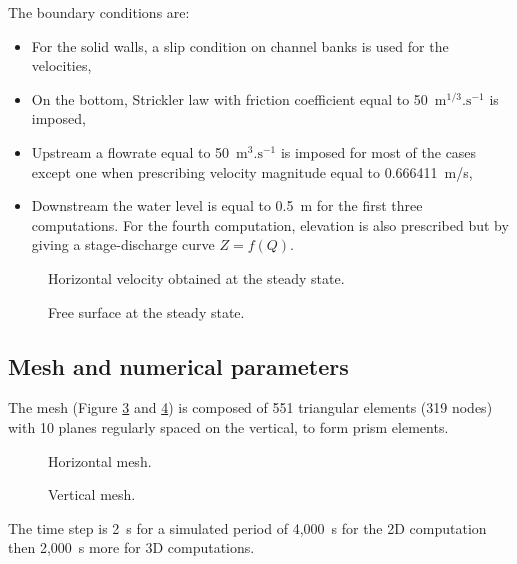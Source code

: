\bigskip
The boundary conditions are:
\begin{itemize}
\item For the solid walls, a slip condition on channel banks is used for the velocities,
\item On the bottom, Strickler law with friction coefficient equal to
50~$\text{m}^{1/3}.\text{s}^{-1}$ is imposed,
\item Upstream a flowrate equal to 50~$\text{m}^{3}.\text{s}^{-1}$ is imposed
for most of the cases except one when prescribing velocity magnitude equal to
0.666411~m/s,
\item Downstream the water level is equal to 0.5~m for the first three
computations.
For the fourth computation, elevation is also prescribed but by giving a
stage-discharge curve $Z = f(Q)$.
\end{itemize}
\begin{figure}[!htbp]
 \centering
 \caption{Horizontal velocity obtained at the steady state.}
 \label{t3d:canal:fig:veloH}
\end{figure}

\begin{figure}[!htbp]
 \centering
 \caption{Free surface at the steady state.}
 \label{t3d:canal:fig:freeSurface}
\end{figure}

\subsection{Mesh and numerical parameters}
\bigskip
The mesh (Figure \ref{t3d:canal:fig:meshH} and \ref{t3d:canal:fig:meshV})  
is composed of 551 triangular elements (319 nodes) with 10 planes  
regularly spaced on the vertical, to form prism elements.\\

\begin{figure}[!htbp]
 \centering
 \caption{Horizontal mesh.}
 \label{t3d:canal:fig:meshH}
\end{figure}
\begin{figure}[!htbp]
 \centering
 \caption{Vertical mesh.}
 \label{t3d:canal:fig:meshV}
\end{figure}


\bigskip
The time step is 2~s for a simulated period of 4,000~s for the 2D computation
then 2,000~s more for 3D computations.

